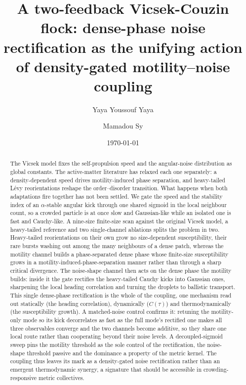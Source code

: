 \documentclass[aps,prresearch,preprint,amsmath,amssymb,nofootinbib,superscriptaddress]{revtex4-2}
\begin{document}
\title{A two-feedback Vicsek-Couzin flock: dense-phase noise rectification as the unifying action of density-gated motility--noise coupling}

\author{Yaya Youssouf Yaya}

\author{Mamadou Sy}

\date{\today}

\begin{abstract}
The Vicsek model fixes the self-propulsion speed and the
angular-noise distribution as global constants. The
active-matter literature has relaxed each one separately: a
density-dependent speed drives motility-induced phase
separation, and heavy-tailed L\'evy reorientations reshape the
order--disorder transition. What happens when both adaptations
fire together has not been settled. We gate the speed and the
stability index of an $\alpha$-stable angular kick through one
shared sigmoid in the local neighbour count, so a crowded
particle is at once slow and Gaussian-like while an isolated
one is fast and Cauchy-like. A nine-size finite-size scan
against the original Vicsek model, a heavy-tailed reference and
two single-channel ablations splits the problem in two. Heavy-tailed
reorientations on their own grow no size-dependent
susceptibility, their rare bursts washing out among the many
neighbours of a dense patch, whereas the motility channel
builds a phase-separated dense phase whose finite-size
susceptibility grows in a motility-induced-phase-separation
manner rather than through a sharp critical divergence. The
noise-shape channel then acts on the dense phase the motility
builds: inside it the gate rectifies the heavy-tailed Cauchy
kicks into Gaussian ones, sharpening the local heading
correlation and turning the droplets to ballistic transport.
This single dense-phase rectification is the whole of the
coupling, one mechanism read out statically (the heading
correlation), dynamically ($C(\tau)$) and thermodynamically (the
susceptibility growth). A matched-noise control confirms it:
retuning the motility-only mode so its kick decorrelates as fast
as the full mode's rectified one makes all three observables
converge and the two channels become additive, so they share one
local route rather than cooperating beyond their noise levels. A
decoupled-sigmoid sweep pins the motility threshold as the sole
control of the rectification, the noise-shape threshold passive
and the dominance a property of the metric kernel. The coupling
thus leaves its mark as a density-gated noise rectification
rather than an emergent thermodynamic synergy, a signature that
should be accessible in crowding-responsive metric collectives.
\end{abstract}
\end{document}
